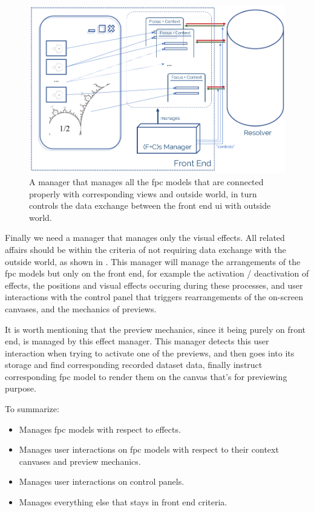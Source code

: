 \begin{figure}[H]
\centering
\includegraphics[width=\textwidth,keepaspectratio]{Figures/Chapter3/fpcmanager.png}
\decoRule
\caption[Manager of All The F+Cs]{A manager that manages all the \gls{fpc} models that are connected properly with corresponding views and outside world, in turn controls the data exchange between the front end \gls{ui} with outside world.}
\label{fig:fpcmanager}
\end{figure}

Finally we need a manager that manages only the visual effects. All related affairs should be within the criteria of not requiring data exchange with the outside world, as shown in . This manager will manage the arrangements of the \gls{fpc} models but only on the front end, for example the activation / deactivation of effects, the positions and visual effects occuring during these processes, and user interactions with the control panel that triggers rearrangements of the on-screen canvases, and the mechanics of previews.

It is worth mentioning that the preview mechanics, since it being purely on front end, is managed by this effect manager. This manager detects this user interaction when trying to activate one of the previews, and then goes into its storage and find corresponding recorded dataset data, finally instruct corresponding \gls{fpc} model to render them on the canvas that's for previewing purpose.

To summarize:

\begin{itemize}
    \item Manages \gls{fpc} models with respect to effects.
    \item Manages user interactions on \gls{fpc} models with respect to their context canvases and preview mechanics.
    \item Manages user interactions on control panels.
    \item Manages everything else that stays in front end criteria.
\end{itemize}

